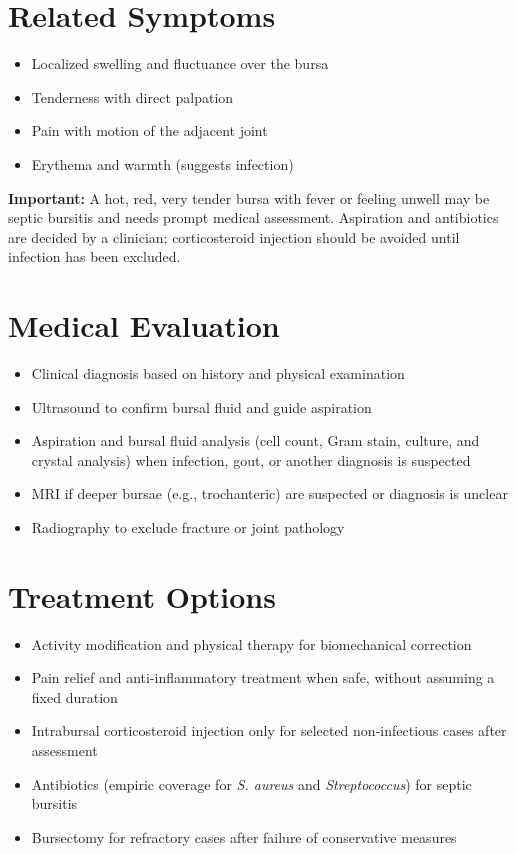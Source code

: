 \section*{Related Symptoms}
\begin{itemize}
 \item Localized swelling and fluctuance over the bursa
 \item Tenderness with direct palpation
 \item Pain with motion of the adjacent joint
 \item Erythema and warmth (suggests infection)
\end{itemize}
\textbf{Important:} A hot, red, very tender bursa with fever or feeling unwell may be septic bursitis and needs prompt medical assessment. Aspiration and antibiotics are decided by a clinician; corticosteroid injection should be avoided until infection has been excluded.

\section*{Medical Evaluation}
\begin{itemize}
 \item Clinical diagnosis based on history and physical examination
 \item Ultrasound to confirm bursal fluid and guide aspiration
 \item Aspiration and bursal fluid analysis (cell count, Gram stain, culture, and crystal analysis) when infection, gout, or another diagnosis is suspected
 \item MRI if deeper bursae (e.g., trochanteric) are suspected or diagnosis is unclear
 \item Radiography to exclude fracture or joint pathology
\end{itemize}

\section*{Treatment Options}
\begin{itemize}
 \item Activity modification and physical therapy for biomechanical correction
 \item Pain relief and anti-inflammatory treatment when safe, without assuming a fixed duration
 \item Intrabursal corticosteroid injection only for selected non-infectious cases after assessment
 \item Antibiotics (empiric coverage for \textit{S. aureus} and \textit{Streptococcus}) for septic bursitis
 \item Bursectomy for refractory cases after failure of conservative measures
\end{itemize}

